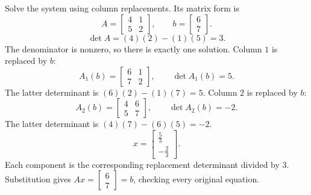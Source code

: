 \goal Solve the system using column replacements. Its matrix form is
\[A=\begin{bmatrix}4&1\\5&2\end{bmatrix},\qquad b=\begin{bmatrix}6\\7\end{bmatrix}.\]
\[\det A=(4)(2)-(1)(5)=3.\]
The denominator is nonzero, so there is exactly one solution.
Column $1$ is replaced by $b$:
\[A_1(b)=\begin{bmatrix}6&1\\7&2\end{bmatrix},\qquad\det A_1(b)=5.\]
The latter determinant is $(6)(2)-(1)(7)=5$.
Column $2$ is replaced by $b$:
\[A_2(b)=\begin{bmatrix}4&6\\5&7\end{bmatrix},\qquad\det A_2(b)=-2.\]
The latter determinant is $(4)(7)-(6)(5)=-2$.
\[x=\begin{bmatrix}\frac{5}{3}\\- \frac{2}{3}\end{bmatrix}.\]
Each component is the corresponding replacement determinant divided by $3$. Substitution gives $Ax=\begin{bmatrix}6\\7\end{bmatrix}=b$, checking every original equation.


